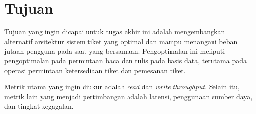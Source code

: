 \section{Tujuan}

Tujuan yang ingin dicapai untuk tugas akhir ini adalah mengembangkan alternatif arsitektur sistem tiket yang optimal dan mampu menangani beban jutaan pengguna pada saat yang bersamaan. Pengoptimalan ini meliputi pengoptimalan pada permintaan baca dan tulis pada basis data, terutama pada operasi permintaan ketersediaan tiket dan pemesanan tiket.

Metrik utama yang ingin diukur adalah \textit{read} dan \textit{write throughput}. Selain itu, metrik lain yang menjadi pertimbangan adalah latensi, penggunaan sumber daya, dan tingkat kegagalan.
